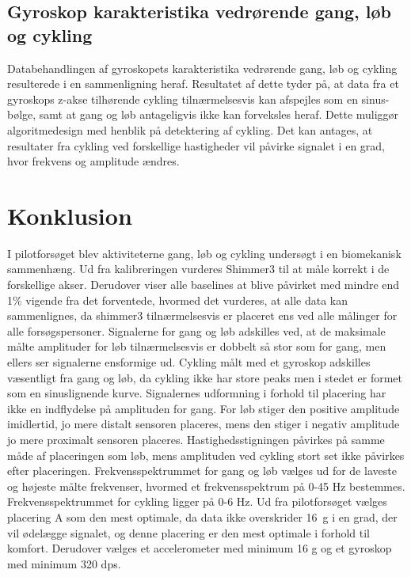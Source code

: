 \subsection{Gyroskop karakteristika vedrørende gang, løb og cykling}
Databehandlingen af gyroskopets karakteristika vedrørende gang, løb og cykling resulterede i en sammenligning heraf. Resultatet af dette tyder på, at data fra et gyroskops z-akse tilhørende cykling tilnærmelsesvis kan afspejles som en sinus-bølge, samt at gang og løb antageligvis ikke kan forveksles heraf. Dette muliggør algoritmedesign med henblik på detektering af cykling. Det kan antages, at resultater fra cykling ved forskellige hastigheder vil påvirke signalet i en grad, hvor frekvens og amplitude ændres.

\section{Konklusion}
I pilotforsøget blev aktiviteterne gang, løb og cykling undersøgt i en biomekanisk sammenhæng. Ud fra kalibreringen vurderes Shimmer3 til at måle korrekt i de forskellige akser. Derudover viser alle baselines at blive påvirket med mindre end 1\% vigende fra det forventede, hvormed det vurderes, at alle data kan sammenlignes, da shimmer3 tilnærmelsesvis er placeret ens ved alle målinger for alle forsøgspersoner. \newline
Signalerne for gang og løb adskilles ved, at de maksimale målte amplituder for løb tilnærmelsesvis er dobbelt så stor som for gang, men ellers ser signalerne ensformige ud. Cykling målt med et gyroskop adskilles væsentligt fra gang og løb, da cykling ikke har store peaks men i stedet er formet som en sinuslignende kurve. \newline
Signalernes udformning i forhold til placering har ikke en indflydelse på amplituden for gang. For løb stiger den positive amplitude imidlertid, jo mere distalt sensoren placeres, mens den stiger i negativ amplitude jo mere proximalt sensoren placeres. Hastighedsstigningen påvirkes på samme måde af placeringen som løb, mens amplituden ved cykling stort set ikke påvirkes efter placeringen. \newline
Frekvensspektrummet for gang og løb vælges ud for de laveste og højeste målte frekvenser, hvormed et frekvensspektrum på 0-45 Hz bestemmes. Frekvensspektrummet for cykling ligger på 0-6 Hz.\newline
Ud fra pilotforsøget vælges placering A som den mest optimale, da data ikke overskrider 16~g i en grad, der vil ødelægge signalet, og denne placering er den mest optimale i forhold til komfort. Derudover vælges et accelerometer med minimum 16 g og et gyroskop med minimum 320 dps.